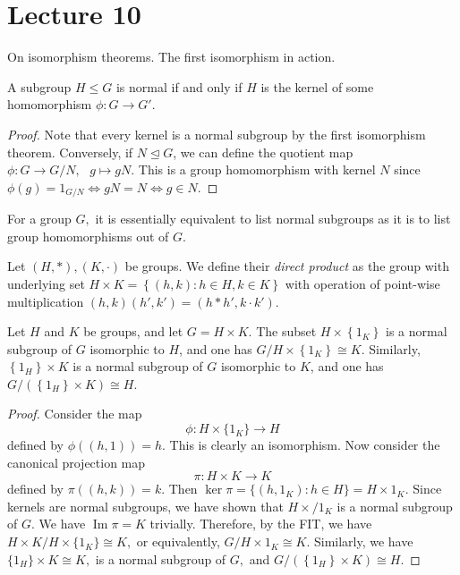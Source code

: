\section{Lecture 10}
On isomorphism theorems. The first isomorphism in action.
\begin{proposition}
  A subgroup $H\leq G$ is normal if and only if $H$ is the kernel of some homomorphism
  $\phi: G\to G'$.
\end{proposition}
\begin{proof}
  Note that every kernel is a normal subgroup by the first isomorphism theorem.
  Conversely, if $N\trianglelefteq G$, we can define the quotient map $\phi:G\to
  G/N, \text{ } g\mapsto gN.$ 
  This is a group homomorphism with kernel $N$ since $\phi(g) = 1_{G/N} \iff gN = N \iff g\in N.$
\end{proof}

\begin{remark}
    For a group $G,$ it is essentially equivalent to list normal subgroups as it is to list group homomorphisms out of $G.$
\end{remark}
\begin{definition}
  Let $(H,*),(K,\cdot)$ be groups. We define their \emph{direct product} as the group
  with underlying set $H\times K = \left\{ (h,k) : h\in H, k\in K \right\}$ with operation
  of point-wise multiplication
  $(h,k)(h',k')=(h*h',k\cdot k').$
  \label{directProduct}
\end{definition}


\begin{proposition}
    Let $H$ and $K$ be groups, and let $G=H \times K$. The subset $H \times\left\{1_K\right\}$ is a normal subgroup of $G$ isomorphic to $H$, and one has $G / H \times\left\{1_K\right\} \cong K$. Similarly, $\left\{1_H\right\} \times K$ is a normal subgroup of $G$ isomorphic to $K$, and one has $G /\left(\left\{1_H\right\} \times K\right) \cong H$.
\end{proposition}

\begin{proof}
    Consider the map
    $$\phi :H\times \{1_K\} \to H$$ defined by $\phi ((h,1))=h.$ This is clearly an isomorphism.
    Now consider the canonical projection map
    $$\pi: H\times K \to K$$ defined by $\pi ((h,k))=k.$
    Then $\ker \pi =\{(h,1_K):h\in H\}=H\times 1_K.$ Since kernels are normal subgroups, we have shown that $H\times /{1_K}$ is a normal subgroup of $G.$ We have $\operatorname{Im} \pi =K$ trivially. Therefore, by the FIT, we have $H\times K / H\times \{1_K\} \cong K,$ or equivalently, $G/H\times {1_K} \cong K.$ 
    Similarly, we have $\{1_H\}\times K \cong K,$ is a normal subgroup of $G,$ and $G /\left(\left\{1_H\right\} \times K\right) \cong H.$
\end{proof}

